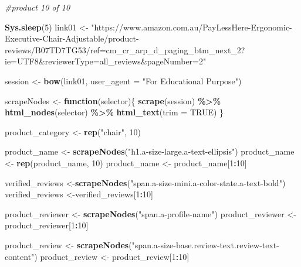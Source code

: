 \documentclass[
]{article}
\newenvironment{Shaded}{\begin{snugshade}}{\end{snugshade}}
\newcommand{\AttributeTok}[1]{\textcolor[rgb]{0.13,0.29,0.53}{#1}}
\newcommand{\CommentTok}[1]{\textcolor[rgb]{0.56,0.35,0.01}{\textit{#1}}}
\newcommand{\ConstantTok}[1]{\textcolor[rgb]{0.56,0.35,0.01}{#1}}
\newcommand{\ControlFlowTok}[1]{\textcolor[rgb]{0.13,0.29,0.53}{\textbf{#1}}}
\newcommand{\DecValTok}[1]{\textcolor[rgb]{0.00,0.00,0.81}{#1}}
\newcommand{\FunctionTok}[1]{\textcolor[rgb]{0.13,0.29,0.53}{\textbf{#1}}}
\newcommand{\NormalTok}[1]{#1}
\newcommand{\OtherTok}[1]{\textcolor[rgb]{0.56,0.35,0.01}{#1}}
\newcommand{\SpecialCharTok}[1]{\textcolor[rgb]{0.81,0.36,0.00}{\textbf{#1}}}
\newcommand{\StringTok}[1]{\textcolor[rgb]{0.31,0.60,0.02}{#1}}
\begin{document}
\begin{Shaded}
\begin{Highlighting}[]
\CommentTok{\#product 10 of 10}
  
\FunctionTok{Sys.sleep}\NormalTok{(}\DecValTok{5}\NormalTok{)}
\NormalTok{link01 }\OtherTok{\textless{}{-}} \StringTok{"https://www.amazon.com.au/PayLessHere{-}Ergonomic{-}Executive{-}Chair{-}Adjustable/product{-}reviews/B07TD7TG53/ref=cm\_cr\_arp\_d\_paging\_btm\_next\_2?ie=UTF8\&reviewerType=all\_reviews\&pageNumber=2"}


\NormalTok{  session }\OtherTok{\textless{}{-}} \FunctionTok{bow}\NormalTok{(link01,}
               \AttributeTok{user\_agent =} \StringTok{"For Educational Purpose"}\NormalTok{)}

\NormalTok{  scrapeNodes }\OtherTok{\textless{}{-}} \ControlFlowTok{function}\NormalTok{(selector)\{}
    \FunctionTok{scrape}\NormalTok{(session) }\SpecialCharTok{\%\textgreater{}\%}
      \FunctionTok{html\_nodes}\NormalTok{(selector) }\SpecialCharTok{\%\textgreater{}\%}
      \FunctionTok{html\_text}\NormalTok{(}\AttributeTok{trim =} \ConstantTok{TRUE}\NormalTok{)}
\NormalTok{  \}}

\NormalTok{  product\_category }\OtherTok{\textless{}{-}} \FunctionTok{rep}\NormalTok{(}\StringTok{"chair"}\NormalTok{, }\DecValTok{10}\NormalTok{)}

\NormalTok{  product\_name }\OtherTok{\textless{}{-}} \FunctionTok{scrapeNodes}\NormalTok{(}\StringTok{"h1.a{-}size{-}large.a{-}text{-}ellipsis"}\NormalTok{)}
\NormalTok{  product\_name }\OtherTok{\textless{}{-}} \FunctionTok{rep}\NormalTok{(product\_name, }\DecValTok{10}\NormalTok{)}
\NormalTok{  product\_name }\OtherTok{\textless{}{-}}\NormalTok{ product\_name[}\DecValTok{1}\SpecialCharTok{:}\DecValTok{10}\NormalTok{]}
  
\NormalTok{  verified\_reviews }\OtherTok{\textless{}{-}}\FunctionTok{scrapeNodes}\NormalTok{(}\StringTok{"span.a{-}size{-}mini.a{-}color{-}state.a{-}text{-}bold"}\NormalTok{)}
\NormalTok{  verified\_reviews }\OtherTok{\textless{}{-}}\NormalTok{verified\_reviews[}\DecValTok{1}\SpecialCharTok{:}\DecValTok{10}\NormalTok{]}
  
\NormalTok{  product\_reviewer }\OtherTok{\textless{}{-}} \FunctionTok{scrapeNodes}\NormalTok{(}\StringTok{"span.a{-}profile{-}name"}\NormalTok{)}
\NormalTok{  product\_reviewer }\OtherTok{\textless{}{-}}\NormalTok{ product\_reviewer[}\DecValTok{1}\SpecialCharTok{:}\DecValTok{10}\NormalTok{]}
  
\NormalTok{  product\_review }\OtherTok{\textless{}{-}} \FunctionTok{scrapeNodes}\NormalTok{(}\StringTok{"span.a{-}size{-}base.review{-}text.review{-}text{-}content"}\NormalTok{)}
\NormalTok{  product\_review }\OtherTok{\textless{}{-}}\NormalTok{ product\_review[}\DecValTok{1}\SpecialCharTok{:}\DecValTok{10}\NormalTok{]}
  

\end{Highlighting}
\end{Shaded}
\end{document}
